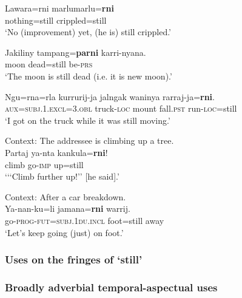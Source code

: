 \begin{exe}
	\ex
	\gll Lawara=rni marlumarlu=\textbf{rni}\\
	nothing=still crippled=still\\
	\glt \lq No (improvement) yet, (he is) still crippled.' \parencite[20]{McConvell1983}
	
	\ex \gll Jakiliny tampang=\textbf{parni} karri-nyana.\\
	moon dead=still be-\textsc{prs}\\
	\glt \lq The moon is still dead (i.e. it is new moon).' \parencite[20]{McConvell1983}
	
	\ex\label{exAppendixGurindji4}
	\gll Ngu=rna=rla kurrurij-ja jalngak waninya rarraj-ja=\textbf{rni}.\\
	\textsc{aux}=\textsc{subj}.1.\textsc{excl}=\textsc{3}.\textsc{obl} truck-\textsc{loc} mount fall.\textsc{pst} run-\textsc{loc}=still\\
	\glt \lq I got on the truck while it was still moving.\rq{ }\parencite[595]{MeakinsMcConvell2021}
	
	\pagebreak
	\ex\label{exAppendixGurindji5}	
	 Context: The addressee is climbing up a tree.\\
	\gll Partaj ya-nta kankula=\textbf{rni}!\\
	climb go-\textsc{imp} up=still\\
	\glt \lq {\lq\lq}Climb further up!\rq\rq{ }[he said].' \parencite[691]{MeakinsMcConvell2021}
	
	\ex\label{exAppendixGurindji6}	
	Context: After a car breakdown.\\
	\gll Ya-nan-ku=li jamana=\textbf{rni} warrij.\\
	go-\textsc{prog}-\textsc{fut}=\textsc{subj}.1\textsc{du}.\textsc{incl} foot=still away\\
	\glt \lq Let’s keep going (just) on foot.’ \parencite[17]{McConvell1983}
	
\end{exe}

\subsubsection{Uses on the fringes of \lq{}still\rq{}}
\subsubsection{Broadly adverbial temporal-aspectual uses}


